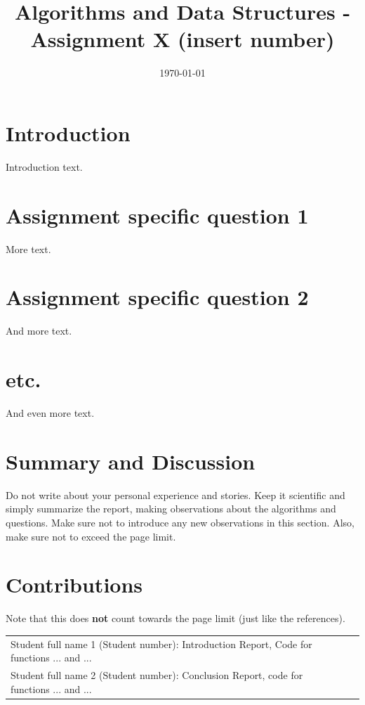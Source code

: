 \documentclass{article}
\title{Algorithms and Data Structures - Assignment X (insert number)
}
\date{\today}
\begin{document}
\maketitle


\section*{Introduction}
Introduction text. 



\section*{Assignment specific question 1}
More text.

\section*{Assignment specific question 2}
And more text. 

\section*{etc.}
And even more text. 



\section*{Summary and Discussion}
Do not write about your personal experience and stories. Keep it scientific and simply summarize the report, making observations about the algorithms and questions. Make sure not to introduce any new observations in this section.
Also, make sure not to exceed the page limit. 






\section*{Contributions}

Note that this does \textbf{not} count towards the page limit (just like the references). 

\noindent\begin{tabular}{@{}ll}

Student full name 1 (Student number): Introduction Report, Code for functions ... and ...  \\
Student full name 2 (Student number): Conclusion Report, code for functions ... and ...
\\

\end{tabular}
\end{document}
